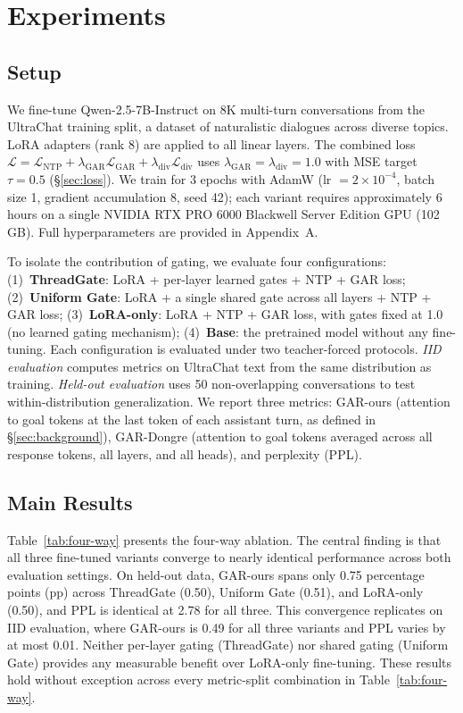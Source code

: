 \section{Experiments}
\label{sec:experiments}

\subsection{Setup}

We fine-tune Qwen-2.5-7B-Instruct on 8K multi-turn conversations from the UltraChat training split, a dataset of naturalistic dialogues across diverse topics. LoRA adapters (rank 8) are applied to all linear layers. The combined loss $\mathcal{L} = \mathcal{L}_\text{NTP} + \lambda_\text{GAR}\mathcal{L}_\text{GAR} + \lambda_\text{div}\mathcal{L}_\text{div}$ uses $\lambda_\text{GAR} = \lambda_\text{div} = 1.0$ with MSE target $\tau = 0.5$ (\S\ref{sec:loss}). We train for 3 epochs with AdamW (lr $= 2 \times 10^{-4}$, batch size 1, gradient accumulation 8, seed 42); each variant requires approximately 6 hours on a single NVIDIA RTX PRO 6000 Blackwell Server Edition GPU (102\,GB). Full hyperparameters are provided in Appendix~A.

To isolate the contribution of gating, we evaluate four configurations: (1)~\textbf{ThreadGate}: LoRA + per-layer learned gates + NTP + GAR loss; (2)~\textbf{Uniform Gate}: LoRA + a single shared gate across all layers + NTP + GAR loss; (3)~\textbf{LoRA-only}: LoRA + NTP + GAR loss, with gates fixed at 1.0 (no learned gating mechanism); (4)~\textbf{Base}: the pretrained model without any fine-tuning. Each configuration is evaluated under two teacher-forced protocols. \emph{IID evaluation} computes metrics on UltraChat text from the same distribution as training. \emph{Held-out evaluation} uses 50 non-overlapping conversations to test within-distribution generalization. We report three metrics: GAR-ours (attention to goal tokens at the last token of each assistant turn, as defined in \S\ref{sec:background}), GAR-Dongre \citep{dongre2026attention} (attention to goal tokens averaged across all response tokens, all layers, and all heads), and perplexity (PPL).

\subsection{Main Results}

Table~\ref{tab:four-way} presents the four-way ablation. The central finding is that all three fine-tuned variants converge to nearly identical performance across both evaluation settings. On held-out data, GAR-ours spans only 0.75 percentage points (pp) across ThreadGate (0.50), Uniform Gate (0.51), and LoRA-only (0.50), and PPL is identical at 2.78 for all three. This convergence replicates on IID evaluation, where GAR-ours is 0.49 for all three variants and PPL varies by at most 0.01. Neither per-layer gating (ThreadGate) nor shared gating (Uniform Gate) provides any measurable benefit over LoRA-only fine-tuning. These results hold without exception across every metric-split combination in Table~\ref{tab:four-way}.

